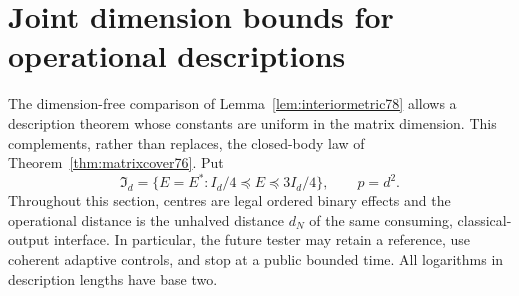 \section{Joint dimension bounds for operational descriptions}
\label{sec:interiorcoding79}
The dimension-free comparison of Lemma~\ref{lem:interiormetric78}
allows a description theorem whose constants are uniform in the
matrix dimension.  This complements, rather than replaces, the
closed-body law of Theorem~\ref{thm:matrixcover76}.  Put
\[
 \mathfrak I_d=\{E=E^*:I_d/4\preceq E\preceq3I_d/4\},\qquad p=d^2.
\]
Throughout this section, centres are legal ordered binary effects
and the operational distance is the unhalved distance $d_N$ of the
same consuming, classical-output interface.  In particular, the
future tester may retain a reference, use coherent adaptive controls,
and stop at a public bounded time.  All logarithms in description
lengths have base two.

